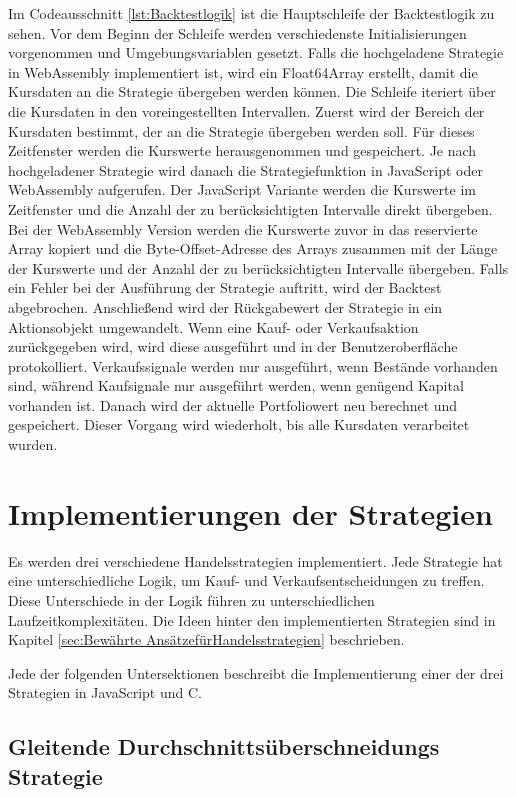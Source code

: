 Im Codeausschnitt \ref{lst:Backtestlogik} ist die Hauptschleife der Backtestlogik zu sehen.
Vor dem Beginn der Schleife werden verschiedenste Initialisierungen vorgenommen und Umgebungsvariablen gesetzt.
Falls die hochgeladene Strategie in WebAssembly implementiert ist, wird ein Float64Array erstellt, damit die Kursdaten an die Strategie übergeben werden können.
Die Schleife iteriert über die Kursdaten in den voreingestellten Intervallen.
Zuerst wird der Bereich der Kursdaten bestimmt, der an die Strategie übergeben werden soll.
Für dieses Zeitfenster werden die Kurswerte herausgenommen und gespeichert.
Je nach hochgeladener Strategie wird danach die Strategiefunktion in JavaScript oder WebAssembly aufgerufen.
Der JavaScript Variante werden die Kurswerte im Zeitfenster und die Anzahl der zu berücksichtigten Intervalle direkt übergeben.
Bei der WebAssembly Version werden die Kurswerte zuvor in das reservierte Array kopiert und die Byte-Offset-Adresse des Arrays zusammen mit der Länge der Kurswerte und der Anzahl der zu berücksichtigten Intervalle übergeben.
Falls ein Fehler bei der Ausführung der Strategie auftritt, wird der Backtest abgebrochen.
Anschließend wird der Rückgabewert der Strategie in ein Aktionsobjekt umgewandelt.
Wenn eine Kauf- oder Verkaufsaktion zurückgegeben wird, wird diese ausgeführt und in der Benutzeroberfläche protokolliert.
Verkaufssignale werden nur ausgeführt, wenn Bestände vorhanden sind, während Kaufsignale nur ausgeführt werden, wenn genügend Kapital vorhanden ist.
Danach wird der aktuelle Portfoliowert neu berechnet und gespeichert.
Dieser Vorgang wird wiederholt, bis alle Kursdaten verarbeitet wurden.

\section{Implementierungen der Strategien}
\label{sec:ImplementierungenderStrategien}

Es werden drei verschiedene Handelsstrategien implementiert. Jede Strategie hat eine unterschiedliche Logik, um Kauf- und Verkaufsentscheidungen zu treffen.
Diese Unterschiede in der Logik führen zu unterschiedlichen Laufzeitkomplexitäten.
Die Ideen hinter den implementierten Strategien sind in Kapitel \ref{sec:Bewährte AnsätzefürHandelsstrategien} beschrieben.

Jede der folgenden Untersektionen beschreibt die Implementierung einer der drei Strategien in JavaScript und C.

\subsection{Gleitende Durchschnittsüberschneidungs Strategie}
\label{subsec:GleitendeDurchschnittsüberschneidungsStrategie}

